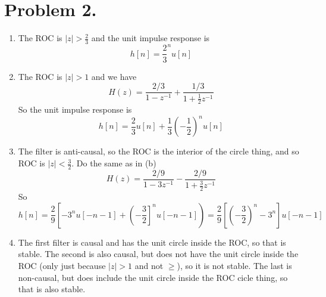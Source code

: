 \documentclass[a4paper,11pt,norsk]{article}
\begin{document}
\section*{Problem 2.}
\begin{enumerate}
    \item The ROC is $|z| > \frac{2}{3}$ and the unit impulse response is 
        \[
            h[n] = \frac{2}{3}^n u[n]
        \]
    \item The ROC is $|z| > 1$ and we have
        \[
            H(z) = \frac{2/3}{1 - z^{-1}} + \frac{1/3}{1 + \frac{1}{2}z^{-1}}
        \]
        So the unit impulse response is
        \[
            h[n] = \frac{2}{3}u[n] + \frac{1}{3}\left(-\frac{1}{2}\right)^n u[n]
        \]
    \item The filter is anti-causal, so the ROC is the interior of the circle thing, and so
        ROC is $|z| < \frac{3}{2}$. Do the same as in (b)
        \[
            H(z) = \frac{2/9}{1 - 3z^{-1}} - \frac{2/9}{1 + \frac{3}{2}z^{-1}}
        \]
        So
        \[
            h[n] = \frac{2}{9}\left[-3^n u[-n-1] + \left(-\frac{3}{2}\right]^n u[-n-1] \right) = \frac{2}{9}\left[\left(-\frac{3}{2}\right)^n - 3^n\right]u[-n-1]
        \]

    \item The first filter is causal and has the unit circle inside the ROC, so that is stable.
        The second is also causal, but does not have the unit circle inside the ROC (only just because $|z| > 1$ and not $\geq$), so it is not stable.
        The last is non-causal, but does include the unit circle inside the ROC cicle thing, so that is also stable.
\end{enumerate}
\end{document}
